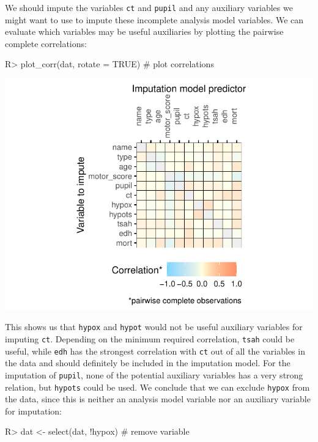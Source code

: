 \documentclass[
]{jss}
\begin{document}
We should impute the variables \texttt{ct} and \texttt{pupil} and any
auxiliary variables we might want to use to impute these incomplete
analysis model variables. We can evaluate which variables may be useful
auxiliaries by plotting the pairwise complete correlations:

\begin{CodeChunk}
\begin{CodeInput}
R> plot_corr(dat, rotate = TRUE) # plot correlations 
\end{CodeInput}


\begin{center}\includegraphics{Imputation_of_Incomplete_Multilevel_Data_files/figure-latex/impact_corr-1} \end{center}

\end{CodeChunk}

This shows us that \texttt{hypox} and \texttt{hypot} would not be useful
auxiliary variables for imputing \texttt{ct}. Depending on the minimum
required correlation, \texttt{tsah} could be useful, while \texttt{edh}
has the strongest correlation with \texttt{ct} out of all the variables
in the data and should definitely be included in the imputation model.
For the imputation of \texttt{pupil}, none of the potential auxiliary
variables has a very strong relation, but \texttt{hypots} could be used.
We conclude that we can exclude \texttt{hypox} from the data, since this
is neither an analysis model variable nor an auxiliary variable for
imputation:

\begin{CodeChunk}
\begin{CodeInput}
R> dat <- select(dat, !hypox)  # remove variable
\end{CodeInput}
\end{CodeChunk}
\end{document}
